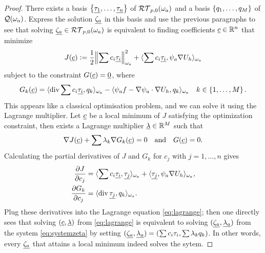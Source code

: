 \documentclass[thesis.tex]{subfiles}
\begin{document}
\begin{proof}
There exists a basis $\set{\underline{\tau_1},\dots, \underline{\tau_n}}$ of $\mathcal{RT}_{p,0}(\omega_a)$ and
  a basis $\set{q_1, \dots, q_M}$ of $\mathcal{Q}(\omega_a)$. Express the solution $\underline{\zeta_a}$ in this basis  and use the previous paragraphs
  to  see that solving $\underline{\zeta_a} \in \mathcal{RT}_{p,0}(\omega_a)$ is
  equivalent to finding coefficients $\underline{c} \in \mathbb{R}^n$ that minimize 
  \[
    J(\underline{c}) := \frac{1}{2} \norm{\sum c_i \underline{\tau_i}}^2_{\omega_a} + \langle \sum c_i \underline{\tau_i}, \psi_a \nabla U_h \rangle_{\omega_a}
  \]
  subject to the constraint $G(\underline{c}) = \underline{0}$, where
  \[
    G_k(\underline{c}) = \langle \operatorname{div} \sum c_i \underline{\tau_i}, q_k \rangle_{\omega_a} - \langle \psi_a f - \nabla \psi_a \cdot \nabla U_h, q_k \rangle_{\omega_a}  \quad k \in \set{1, \dots, M}.
  \]
  This appears like a classical optimisation problem, and we can solve it using the Lagrange multiplier. 
  Let $\underline{c}$ be a local minimum of $J$ satisfying the optimization constraint, then
  exists a Lagrange multiplier $\underline{\lambda} \in \mathbb{R}^{M}$ such that 
   \begin{equation}
     \label{eq:lagrange}
     \nabla J(\underline{c}) + \sum \lambda_k \nabla G_k(\underline{c}) = 0\quad \text{and} \quad G(\underline{c}) = 0.
   \end{equation}
   Calculating the partial derivatives of $J$ and $G_k$ for $c_j$ with $j=1,\dots, n$ gives
   \begin{align*}
     \frac{\partial J}{\partial c_j} &= \langle  \sum c_i \underline{\tau_i}, \underline{\tau_j} \rangle_{\omega_a} + \langle \underline{\tau_j}, \psi_a \nabla U_h \rangle_{\omega_a},\\
     \frac{\partial G_k}{\partial c_j} &= \langle \operatorname{div} \underline{\tau_j}, q_k \rangle_{\omega_a}.
   \end{align*}
   Plug these derivatives into the Lagrange equation \eqref{eq:lagrange}; then one directly sees that
   solving $(\underline{c}, \underline{\lambda})$ from \eqref{eq:lagrange} is equivalent to solving $(\underline{\zeta_a}, \underline{\lambda_a})$ from
   the system \eqref{eq:systemzeta} by setting $(\underline{\zeta_a},{\underline{\lambda_a}}) = (\sum c_i \tau_i, \sum \lambda_k q_k)$.
   In other words, every $\underline{\zeta_a}$ that attains a local minimum indeed solves the sytem.


\end{proof}
\end{document}

